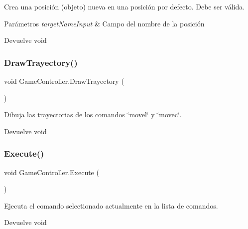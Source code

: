 Crea una posición (objeto) nueva en una posición por defecto. Debe ser válida. 
\begin{DoxyParams}{Parámetros}
{\em target\+Name\+Input} & Campo del nombre de la posición \\
\hline
\end{DoxyParams}
\begin{DoxyReturn}{Devuelve}
void 
\end{DoxyReturn}
\mbox{\label{class_game_controller_afd55aa0db0046a73a2b9bb57dc56d373}} 
\subsubsection{\texorpdfstring{DrawTrayectory()}{DrawTrayectory()}}
{\footnotesize\ttfamily void Game\+Controller.\+Draw\+Trayectory (\begin{DoxyParamCaption}{ }\end{DoxyParamCaption})\hspace{0.3cm}{\ttfamily [inline]}}

Dibuja las trayectorias de los comandos \char`\"{}movel\char`\"{} y \char`\"{}movec\char`\"{}. \begin{DoxyReturn}{Devuelve}
void 
\end{DoxyReturn}
\mbox{\label{class_game_controller_ac1dcb5c2f0422f5568ca776dd5cd7b7c}} 
\subsubsection{\texorpdfstring{Execute()}{Execute()}}
{\footnotesize\ttfamily void Game\+Controller.\+Execute (\begin{DoxyParamCaption}{ }\end{DoxyParamCaption})\hspace{0.3cm}{\ttfamily [inline]}}

Ejecuta el comando selectionado actualmente en la lista de comandos. \begin{DoxyReturn}{Devuelve}
void 
\end{DoxyReturn}
\mbox{\label{class_game_controller_ab8bc597c4e47a3cece068762cdfaf33a}} 
